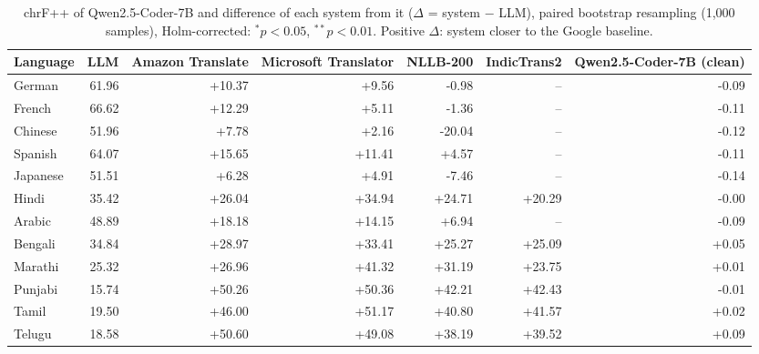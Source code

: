 \begin{table}[t]
\centering
\caption{chrF++ of Qwen2.5-Coder-7B and difference of each system from it ($\Delta$ = system $-$ LLM), paired bootstrap resampling (1,000 samples), Holm-corrected: $^{*}p<0.05$, $^{**}p<0.01$. Positive $\Delta$: system closer to the Google baseline.\label{tab:significance}}
\begin{tabular}{l rrrrrr}
\toprule
Language & LLM & Amazon Translate & Microsoft Translator & NLLB-200 & IndicTrans2 & Qwen2.5-Coder-7B (clean) \\
\midrule
German & 61.96 & +10.37 & +9.56 & -0.98 & -- & -0.09 \\
French & 66.62 & +12.29 & +5.11 & -1.36 & -- & -0.11 \\
Chinese & 51.96 & +7.78 & +2.16 & -20.04 & -- & -0.12 \\
Spanish & 64.07 & +15.65 & +11.41 & +4.57 & -- & -0.11 \\
Japanese & 51.51 & +6.28 & +4.91 & -7.46 & -- & -0.14 \\
Hindi & 35.42 & +26.04 & +34.94 & +24.71 & +20.29 & -0.00 \\
Arabic & 48.89 & +18.18 & +14.15 & +6.94 & -- & -0.09 \\
Bengali & 34.84 & +28.97 & +33.41 & +25.27 & +25.09 & +0.05 \\
Marathi & 25.32 & +26.96 & +41.32 & +31.19 & +23.75 & +0.01 \\
Punjabi & 15.74 & +50.26 & +50.36 & +42.21 & +42.43 & -0.01 \\
Tamil & 19.50 & +46.00 & +51.17 & +40.80 & +41.57 & +0.02 \\
Telugu & 18.58 & +50.60 & +49.08 & +38.19 & +39.52 & +0.09 \\
\bottomrule
\end{tabular}
\end{table}

